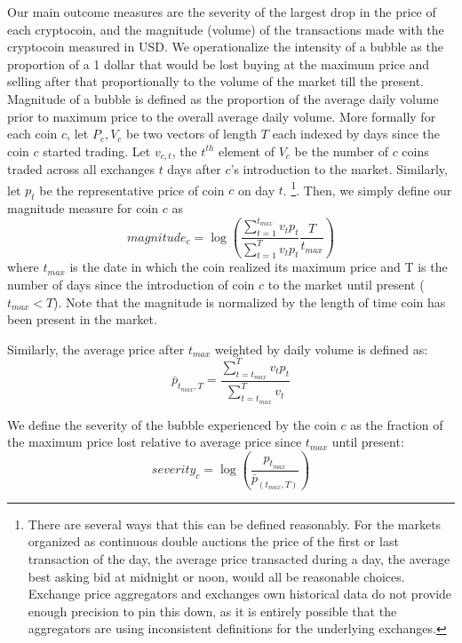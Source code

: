 Our main outcome measures are the severity of the largest drop in the price of each cryptocoin, and the magnitude (volume) of the transactions made with the cryptocoin measured in USD.
We operationalize the intensity of a bubble as the proportion of a 1 dollar that would be lost buying at the maximum price and selling after that proportionally to the volume of the market till the present. Magnitude of a bubble is defined as the proportion of the average daily volume prior to maximum price to the overall average daily volume.
More formally for each coin $c$, let $P_c,V_c$ be two vectors of length $T$ each indexed by days since the coin $c$ started trading.
Let $v_{c,t}$, the $t^{th}$ element of $V_c$ be the number of $c$ coins traded across all exchanges $t$ days after $c$'s introduction to the market. 
Similarly, let $p_t$ be the representative price of coin $c$ on day $t$.
\footnote{There are several ways that this can be defined reasonably. For the markets organized as continuous double auctions the price of the first or last transaction of the day,  the average price transacted during a day, the average best asking bid at midnight or noon, would all be reasonable choices. Exchange price aggregators and exchanges own historical data do not provide enough precision to pin this down, as it is entirely possible that the aggregators are using inconsistent definitions for the underlying exchanges.}. Then, we simply define our magnitude measure for coin $c$ as
\begin{equation}
magnitude_{c} = \log(\frac{\sum_{t=1}^{t_{max}} v_t p_t} {\sum_{t=1}^{T} v_t  p_t} \frac{T}{t_{max}})
\end{equation}
where $t_{max}$ is the date in which the coin realized its maximum price and T is the number of days since the introduction of coin $c$ to the market until present ($t_{max} < T$). Note that the magnitude is normalized by the length of time coin has been present in the market.

Similarly, the average price after $t_{max}$ weighted by daily volume is defined as:
\begin{equation}
\bar{p}_{t_{max},T} = \frac{\sum_{t=t_{max}}^{T} v_t p_t} {\sum_{t=t_{max}}^{T} v_t}
\end{equation}

We define the severity of the bubble experienced by the coin $c$ as the fraction of the maximum price lost relative to average price since $t_{max}$ until present:
\begin{equation}
severity_{c} = \log(\frac{ p_{t_{max}}} {\bar{p}_{(t_{max},T)} })
\end{equation}

